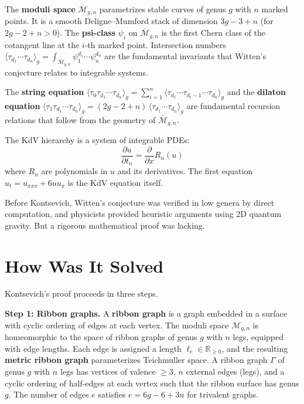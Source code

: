 The \textbf{moduli space} $\overline{\mathcal{M}}_{g,n}$
parametrizes stable curves of genus $g$ with $n$ marked points.
It is a smooth Deligne--Mumford stack of dimension $3g-3+n$ (for
$2g-2+n>0$).  The \textbf{psi-class} $\psi_i$ on
$\overline{\mathcal{M}}_{g,n}$ is the first Chern class of the
cotangent line at the $i$-th marked point.  Intersection numbers
$\langle\tau_{d_1}\cdots\tau_{d_n}\rangle_g
 = \int_{\overline{\mathcal{M}}_{g,n}}\psi_1^{d_1}\cdots\psi_n^{d_n}$
are the fundamental invariants that Witten's conjecture relates to
integrable systems.

The \textbf{string equation}
$\langle\tau_0\tau_{d_1}\cdots\tau_{d_n}\rangle_g
 = \sum_{i=1}^{n}
   \langle\tau_{d_1}\cdots\tau_{d_i-1}\cdots\tau_{d_n}\rangle_g$
and the \textbf{dilaton equation}
$\langle\tau_1\tau_{d_1}\cdots\tau_{d_n}\rangle_g
 = (2g-2+n)\,\langle\tau_{d_1}\cdots\tau_{d_n}\rangle_g$
are fundamental recursion relations that follow from the geometry of
$\overline{\mathcal{M}}_{g,n}$.

The KdV hierarchy is a system of integrable PDEs:
\[
  \frac{\partial u}{\partial t_n}
  = \frac{\partial}{\partial x}R_n(u)
\]
where $R_n$ are polynomials in $u$ and its derivatives.  The first
equation $u_t = u_{xxx}+6uu_x$ is the KdV equation itself.

Before Kontsevich, Witten's conjecture was verified in low genera
by direct computation, and physicists provided heuristic arguments
using 2D quantum gravity.  But a rigorous mathematical proof was
lacking.

\section{How Was It Solved}

Kontsevich's proof \cite{kontsevich1992} proceeds in three steps.

\textbf{Step 1: Ribbon graphs.}
A \textbf{ribbon graph} is a graph embedded in a surface with
cyclic ordering of edges at each vertex.  The moduli space
$\mathcal{M}_{g,n}$ is homeomorphic to the space of ribbon graphs
of genus $g$ with $n$ legs, equipped with edge lengths.  Each edge
is assigned a length $\ell_e\in\mathbb{R}_{\geq 0}$, and the
resulting \textbf{metric ribbon graph} parameterizes Teichmuller
space.  A ribbon graph $\Gamma$ of genus $g$ with $n$ legs has
vertices of valence $\geq 3$, $n$ external edges (legs), and a
cyclic ordering of half-edges at each vertex such that the ribbon
surface has genus $g$.  The number of edges $e$ satisfies
$e=6g-6+3n$ for trivalent graphs.

